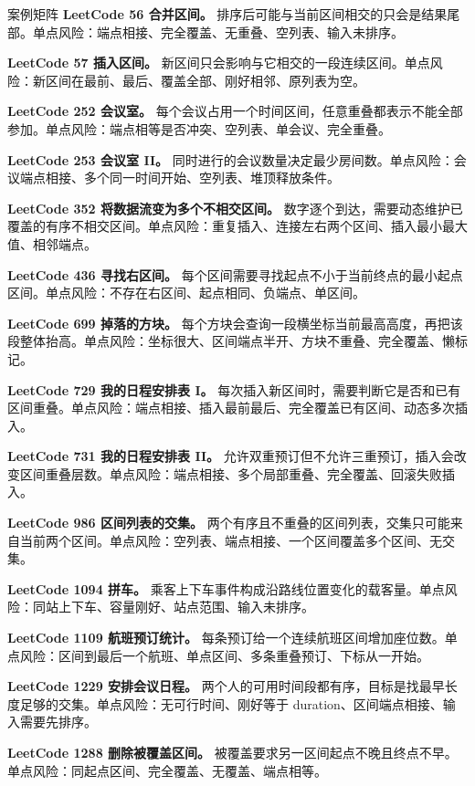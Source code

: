 \begin{principlebox}{案例矩阵}
\textbf{LeetCode 56 合并区间。}
排序后可能与当前区间相交的只会是结果尾部。单点风险：端点相接、完全覆盖、无重叠、空列表、输入未排序。

\textbf{LeetCode 57 插入区间。}
新区间只会影响与它相交的一段连续区间。单点风险：新区间在最前、最后、覆盖全部、刚好相邻、原列表为空。

\textbf{LeetCode 252 会议室。}
每个会议占用一个时间区间，任意重叠都表示不能全部参加。单点风险：端点相等是否冲突、空列表、单会议、完全重叠。

\textbf{LeetCode 253 会议室 II。}
同时进行的会议数量决定最少房间数。单点风险：会议端点相接、多个同一时间开始、空列表、堆顶释放条件。

\textbf{LeetCode 352 将数据流变为多个不相交区间。}
数字逐个到达，需要动态维护已覆盖的有序不相交区间。单点风险：重复插入、连接左右两个区间、插入最小最大值、相邻端点。

\textbf{LeetCode 436 寻找右区间。}
每个区间需要寻找起点不小于当前终点的最小起点区间。单点风险：不存在右区间、起点相同、负端点、单区间。

\textbf{LeetCode 699 掉落的方块。}
每个方块会查询一段横坐标当前最高高度，再把该段整体抬高。单点风险：坐标很大、区间端点半开、方块不重叠、完全覆盖、懒标记。

\textbf{LeetCode 729 我的日程安排表 I。}
每次插入新区间时，需要判断它是否和已有区间重叠。单点风险：端点相接、插入最前最后、完全覆盖已有区间、动态多次插入。

\textbf{LeetCode 731 我的日程安排表 II。}
允许双重预订但不允许三重预订，插入会改变区间重叠层数。单点风险：端点相接、多个局部重叠、完全覆盖、回滚失败插入。

\textbf{LeetCode 986 区间列表的交集。}
两个有序且不重叠的区间列表，交集只可能来自当前两个区间。单点风险：空列表、端点相接、一个区间覆盖多个区间、无交集。

\textbf{LeetCode 1094 拼车。}
乘客上下车事件构成沿路线位置变化的载客量。单点风险：同站上下车、容量刚好、站点范围、输入未排序。

\textbf{LeetCode 1109 航班预订统计。}
每条预订给一个连续航班区间增加座位数。单点风险：区间到最后一个航班、单点区间、多条重叠预订、下标从一开始。

\textbf{LeetCode 1229 安排会议日程。}
两个人的可用时间段都有序，目标是找最早长度足够的交集。单点风险：无可行时间、刚好等于 duration、区间端点相接、输入需要先排序。

\textbf{LeetCode 1288 删除被覆盖区间。}
被覆盖要求另一区间起点不晚且终点不早。单点风险：同起点区间、完全覆盖、无覆盖、端点相等。

\end{principlebox}

